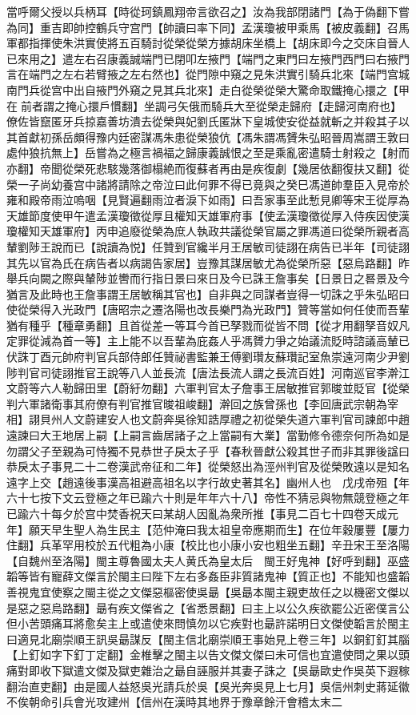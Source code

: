當呼爾父授以兵柄耳【時從珂鎮鳳翔帝言欲召之】汝為我部閉諸門【為于偽翻下嘗為同】重吉即帥控鶴兵守宫門【帥讀曰率下同】孟漢瓊被甲乘馬【被皮義翻】召馬軍都指揮使朱洪實使將五百騎討從榮從榮方據胡床坐橋上【胡床即今之交床自晉人已來用之】遣左右召康義誠端門已閉叩左掖門【端門之東門曰左掖門西門曰右掖門言在端門之左右若臂掖之左右然也】從門隙中窺之見朱洪實引騎兵北來【端門宫城南門兵從宫中出自掖門外窺之見其兵北來】走白從榮從榮大驚命取鐵掩心擐之【甲在前者謂之掩心擐戶慣翻】坐調弓矢俄而騎兵大至從榮走歸府【走歸河南府也】僚佐皆竄匿牙兵掠嘉善坊潰去從榮與妃劉氏匿牀下皇城使安從益就斬之并殺其子以其首獻初孫岳頗得豫内廷密謀馮朱患從榮狼伉【馮朱謂馮贇朱弘昭晉周嵩謂王敦曰處仲狼抗無上】岳嘗為之極言禍福之歸康義誠恨之至是乘亂密遣騎士射殺之【射而亦翻】帝聞從榮死悲駭幾落御榻絶而復蘇者再由是疾復劇【幾居依翻復扶又翻】從榮一子尚幼養宫中諸將請除之帝泣曰此何罪不得已竟與之癸巳馮道帥羣臣入見帝於雍和殿帝雨泣嗚咽【見賢遍翻雨泣者淚下如雨】曰吾家事至此慙見卿等宋王從厚為天雄節度使甲午遣孟漢瓊徵從厚且權知天雄軍府事【使孟漢瓊徵從厚入侍疾因使漢瓊權知天雄軍府】丙申追廢從榮為庶人執政共議從榮官屬之罪馮道曰從榮所親者高輦劉陟王說而已【說讀為悦】任贊到官纔半月王居敏司徒詡在病告已半年【司徒詡其先以官為氏在病告者以病謁告家居】豈豫其謀居敏尤為從榮所惡【惡烏路翻】昨舉兵向闕之際與輦陟並轡而行指日景曰來日及今已誅王詹事矣【日景日之晷景及今猶言及此時也王詹事謂王居敏稱其官也】自非與之同謀者豈得一切誅之乎朱弘昭曰使從榮得入光政門【唐昭宗之遷洛陽也改長樂門為光政門】贊等當如何任使而吾輩猶有種乎【種章勇翻】且首從差一等耳今首已孥戮而從皆不問【從才用翻孥音奴凡定罪從減為首一等】主上能不以吾輩為庇姦人乎馮贇力爭之始議流貶時諮議高輦已伏誅丁酉元帥府判官兵部侍郎任贊祕書監兼王傅劉瓚友蘇瓚記室魚崇遠河南少尹劉陟判官司徒詡推官王說等八人並長流【唐法長流人謂之長流百姓】河南巡官李澣江文蔚等六人勒歸田里【蔚紆勿翻】六軍判官太子詹事王居敏推官郭晙並貶官【從榮判六軍諸衛事其府僚有判官推官晙祖峻翻】澣回之族曾孫也【李回唐武宗朝為宰相】詡貝州人文蔚建安人也文蔚奔吳徐知誥厚禮之初從榮失道六軍判官司諫郎中趙遠諫曰大王地居上嗣【上嗣言齒居諸子之上當嗣有大業】當勤修令德奈何所為如是勿謂父子至親為可恃獨不見恭世子戾太子乎【春秋晉獻公殺其世子而非其罪後諡曰恭戾太子事見二十二卷漢武帝征和二年】從榮怒出為涇州判官及從榮敗遠以是知名遠字上交【趙遠後事漢高祖避高祖名以字行故史著其名】幽州人也　戊戌帝殂【年六十七按下文云登極之年已踰六十則是年年六十八】帝性不猜忌與物無競登極之年已踰六十每夕於宫中焚香祝天曰某胡人因亂為衆所推【事見二百七十四卷天成元年】願天早生聖人為生民主【范仲淹曰我太祖皇帝應期而生】在位年穀屢豐【屢力住翻】兵革罕用校於五代粗為小康【校比也小康小安也粗坐五翻】辛丑宋王至洛陽【自魏州至洛陽】閩主尊魯國太夫人黄氏為皇太后　閩王好鬼神【好呼到翻】巫盛韜等皆有寵薛文傑言於閩主曰陛下左右多姦臣非質諸鬼神【質正也】不能知也盛韜善視鬼宜使察之閩主從之文傑惡樞密使吳朂【吳朂本閩主親吏故任之以機密文傑以是惡之惡烏路翻】朂有疾文傑省之【省悉景翻】曰主上以公久疾欲罷公近密僕言公但小苦頭痛耳將愈矣主上或遣使來問慎勿以它疾對也朂許諾明日文傑使韜言於閩主曰適見北廟崇順王訊吳朂謀反【閩主信北廟崇順王事始見上卷三年】以銅釘釘其腦【上釘如字下釘丁定翻】金椎擊之閩主以告文傑文傑曰未可信也宜遣使問之果以頭痛對即收下獄遣文傑及獄吏雜治之朂自誣服并其妻子誅之【吳朂歐史作吳英下遐稼翻治直吏翻】由是國人益怒吳光請兵於吳【吳光奔吳見上七月】吳信州刺史蔣延徽不俟朝命引兵會光攻建州【信州在漢時其地界于豫章餘汗會稽太末二